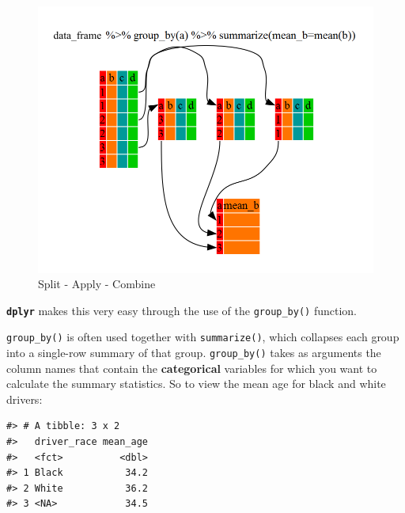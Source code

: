 \documentclass[]{book}
\newenvironment{Shaded}{\begin{snugshade}}{\end{snugshade}}
\newcommand{\DataTypeTok}[1]{\textcolor[rgb]{0.13,0.29,0.53}{#1}}
\newcommand{\KeywordTok}[1]{\textcolor[rgb]{0.13,0.29,0.53}{\textbf{#1}}}
\newcommand{\NormalTok}[1]{#1}
\newcommand{\OperatorTok}[1]{\textcolor[rgb]{0.81,0.36,0.00}{\textbf{#1}}}
\newcommand{\OtherTok}[1]{\textcolor[rgb]{0.56,0.35,0.01}{#1}}
\newcommand{\StringTok}[1]{\textcolor[rgb]{0.31,0.60,0.02}{#1}}
\begin{document}
\begin{figure}
\includegraphics[width=\textwidth]{img/split-apply-combine} \caption{Split - Apply - Combine}\label{fig:split-apply-combine}
\end{figure}

\textbf{\texttt{dplyr}} makes this very easy through the use of the
\texttt{group\_by()} function.

\texttt{group\_by()} is often used together with \texttt{summarize()}, which collapses each
group into a single-row summary of that group. \texttt{group\_by()} takes as arguments
the column names that contain the \textbf{categorical} variables for which you want
to calculate the summary statistics. So to view the mean age for black and white drivers:

\begin{Shaded}
\end{Shaded}

\begin{verbatim}
#> # A tibble: 3 x 2
#>   driver_race mean_age
#>   <fct>          <dbl>
#> 1 Black           34.2
#> 2 White           36.2
#> 3 <NA>            34.5
\end{verbatim}
\end{document}
